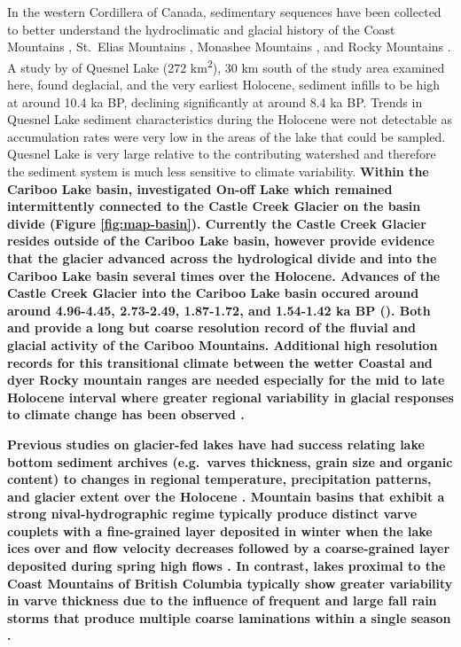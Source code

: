 \documentclass[Royal,times,doublespace,sageh]{sagej}
\begin{document}
In the western Cordillera of Canada, sedimentary sequences have been
collected to better understand the hydroclimatic and glacial history of
the Coast Mountains \citep{Menounos2008c}, St.~Elias Mountains
\citep{Crookshanks2008}, Monashee Mountains \citep{Hodder2006b}, and
Rocky Mountains \citep{Leonard1986, Dirszowsky1997a, Desloges1999}. A
study by \citet{Gilbert2012} of Quesnel Lake (272
km\textsuperscript{2}), 30 km south of the study area examined here,
found deglacial, and the very earliest Holocene, sediment infills to be
high at around 10.4 ka BP, declining significantly at around 8.4 ka BP.
Trends in Quesnel Lake sediment characteristics during the Holocene were
not detectable as accumulation rates were very low in the areas of the
lake that could be sampled. Quesnel Lake is very large relative to the
contributing watershed and therefore the sediment system is much less
sensitive to climate variability. \textbf{Within the Cariboo Lake basin,
\citet{Maurer2012b} investigated On-off Lake which remained
intermittently connected to the Castle Creek Glacier on the basin divide
(Figure \ref{fig:map-basin}). Currently the Castle Creek Glacier resides
outside of the Cariboo Lake basin, however \citet{Maurer2012b} provide
evidence that the glacier advanced across the hydrological divide and
into the Cariboo Lake basin several times over the Holocene. Advances of
the Castle Creek Glacier into the Cariboo Lake basin occured around
around 4.96-4.45, 2.73-2.49, 1.87-1.72, and 1.54-1.42 ka BP
(\citet{Maurer2012b}). Both \citet{Gilbert2012} and \citet{Maurer2012b}
provide a long but coarse resolution record of the fluvial and glacial
activity of the Cariboo Mountains. Additional high resolution records
for this transitional climate between the wetter Coastal and dyer Rocky
mountain ranges are needed especially for the mid to late Holocene
interval where greater regional variability in glacial responses to
climate change has been observed \citep{Steinman2019, Menounos2009b}.}

\textbf{Previous studies on glacier-fed lakes have had success relating
lake bottom sediment archives (e.g.~varves thickness, grain size and
organic content) to changes in regional temperature, precipitation
patterns, and glacier extent over the Holocene
\citep{Desloges1999, Hodder2006b, Leonard1997, Menounos2006b, Menounos2008c}.
Mountain basins that exhibit a strong nival-hydrographic regime
typically produce distinct varve couplets with a fine-grained layer
deposited in winter when the lake ices over and flow velocity decreases
followed by a coarse-grained layer deposited during spring high flows
\citep[e.g.][]{Leonard1997, Hodder2007c, Desloges1999}. In contrast,
lakes proximal to the Coast Mountains of British Columbia typically show
greater variability in varve thickness due to the influence of frequent
and large fall rain storms that produce multiple coarse laminations
within a single season \citep[e.g.][]{Gilbert1997, Menounos2008c}.}
\end{document}

